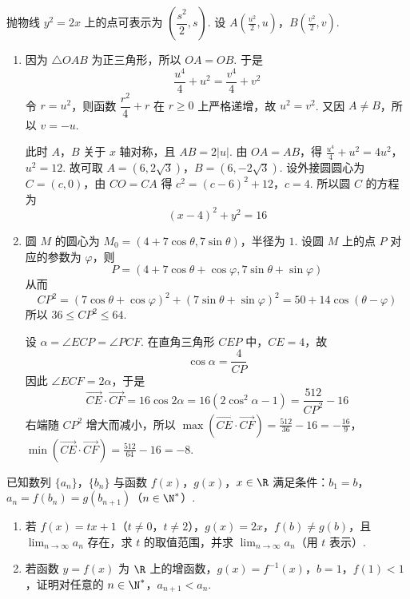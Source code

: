 \begin{solution}
抛物线 \(y^{2}=2x\) 上的点可表示为 \(\left(\dfrac{s^{2}}{2},s\right)\). 设
\(A\left(\frac{u^{2}}{2},u\right)\)，\(B\left(\frac{v^{2}}{2},v\right)\).

\begin{enumerate}
\item 因为 \(\triangle OAB\) 为正三角形，所以 \(OA=OB\). 于是
\[
\frac{u^{4}}{4}+u^{2}=\frac{v^{4}}{4}+v^{2}
\]
令 \(r=u^{2}\)，则函数 \(\dfrac{r^{2}}{4}+r\) 在 \(r\geqslant0\) 上严格递增，故 \(u^{2}=v^{2}\). 又因 \(A\ne B\)，所以 \(v=-u\).

此时 \(A\)，\(B\) 关于 \(x\) 轴对称，且 \(AB=2|u|\). 由 \(OA=AB\)，得
\(\frac{u^{4}}{4}+u^{2}=4u^{2}\)，\(u^{2}=12\).
故可取 \(A=(6,2\sqrt{3})\)，\(B=(6,-2\sqrt{3})\). 设外接圆圆心为 \(C=(c,0)\)，由 \(CO=CA\) 得
\(c^{2}=(c-6)^{2}+12\)，\(c=4\).
所以圆 \(C\) 的方程为
\[
(x-4)^{2}+y^{2}=16
\]
\item 圆 \(M\) 的圆心为 \(M_{0}=(4+7\cos\theta,7\sin\theta)\)，半径为 \(1\). 设圆 \(M\) 上的点 \(P\) 对应的参数为 \(\varphi\)，则
\[
P=(4+7\cos\theta+\cos\varphi,7\sin\theta+\sin\varphi)
\]
从而
\[
CP^{2}=(7\cos\theta+\cos\varphi)^{2}+(7\sin\theta+\sin\varphi)^{2}=50+14\cos(\theta-\varphi)
\]
所以 \(36\leqslant CP^{2}\leqslant64\).

设 \(\alpha=\angle ECP=\angle PCF\). 在直角三角形 \(CEP\) 中，\(CE=4\)，故
\[
\cos\alpha=\frac{4}{CP}
\]
因此 \(\angle ECF=2\alpha\)，于是
\[
\overrightarrow{CE}\cdot\overrightarrow{CF}=16\cos2\alpha=16\left(2\cos^{2}\alpha-1\right)=\frac{512}{CP^{2}}-16
\]
右端随 \(CP^{2}\) 增大而减小，所以
\(\max\left(\overrightarrow{CE}\cdot\overrightarrow{CF}\right)=\frac{512}{36}-16=-\frac{16}{9}\)，\(\min\left(\overrightarrow{CE}\cdot\overrightarrow{CF}\right)=\frac{512}{64}-16=-8\).
\end{enumerate}
\end{solution}

\begin{problem}
已知数列 \(\{a_{n}\}\)，\(\{b_{n}\}\) 与函数 \(f(x)\)，\(g(x)\)，\(x \in \R\) 满足条件：\(b_{1} = b\)，\(a_{n} = f(b_{n}) = g(b_{n+1})\)（\(n \in \N^{*}\)）.

\begin{enumerate}
\item 若 \(f(x) = tx + 1\)（\(t \neq 0\)，\(t \neq 2\)），\(g(x) = 2x\)，\(f(b) \neq g(b)\)，且 \(\displaystyle\lim_{n \to \infty} a_n\) 存在，求 \(t\) 的取值范围，并求 \(\displaystyle\lim_{n \to \infty} a_n\)（用 \(t\) 表示）.
\item 若函数 \(y = f(x)\) 为 \(\R\) 上的增函数，\(g(x) = f^{-1}(x)\)，\(b = 1\)，\(f(1) < 1\)，证明对任意的 \(n \in \N^{*}\)，\(a_{n+1} < a_n\).
\end{enumerate}
\end{problem}

